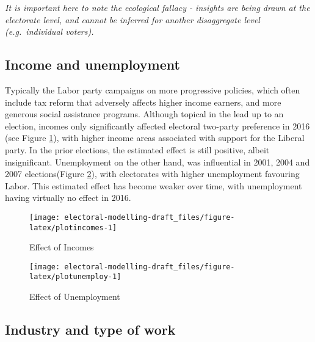 \documentclass[openany]{book}
\begin{document}
\emph{It is important here to note the ecological fallacy - insights are being drawn at the electorate level, and cannot be inferred for another disaggregate level (e.g.~individual voters).}

\hypertarget{income-and-unemployment}{%
\subsection{Income and unemployment}\label{income-and-unemployment}}

Typically the Labor party campaigns on more progressive policies, which often include tax reform that adversely affects higher income earners, and more generous social assistance programs. Although topical in the lead up to an election, incomes only significantly affected electoral two-party preference in 2016 (see Figure \ref{fig:plotincomes}), with higher income areas associated with support for the Liberal party. In the prior elections, the estimated effect is still positive, albeit insignificant. Unemployment on the other hand, was influential in 2001, 2004 and 2007 elections(Figure \ref{fig:plotunemploy}), with electorates with higher unemployment favouring Labor. This estimated effect has become weaker over time, with unemployment having virtually no effect in 2016.

\begin{figure}[h]

{\centering \texttt{[image: electoral-modelling-draft\_files/figure-latex/plotincomes-1]} 

}

\caption{Effect of Incomes}\label{fig:plotincomes}
\end{figure}

\begin{figure}[h]

{\centering \texttt{[image: electoral-modelling-draft\_files/figure-latex/plotunemploy-1]} 

}

\caption{Effect of Unemployment}\label{fig:plotunemploy}
\end{figure}

\hypertarget{industry-and-type-of-work}{%
\subsection{Industry and type of work}\label{industry-and-type-of-work}}
\end{document}
